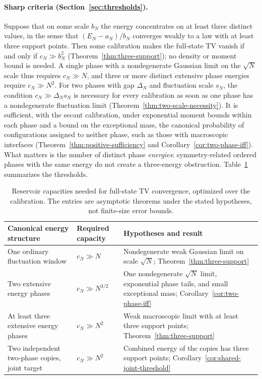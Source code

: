 \paragraph{Sharp criteria (Section~\ref{sec:thresholds}).}
Suppose that on some scale $b_N$ the energy concentrates on at least
three distinct values, in the sense that $(E_N-a_N)/b_N$ converges
weakly to a law with at least three support points. Then some
calibration makes the full-state TV vanish if and only if
$c_N\gg b_N^2$ (Theorem~\ref{thm:three-support}); no density or moment
bound is needed. A single phase with a nondegenerate Gaussian limit on
the $\sqrt N$ scale thus requires $c_N\gg N$, and three or more
distinct extensive phase energies require $c_N\gg N^2$. For two phases
with gap $\Delta_N$ and fluctuation scale $s_N$, the condition
$c_N\gg\Delta_Ns_N$ is necessary for every calibration as soon as one
phase has a nondegenerate fluctuation limit
(Theorem~\ref{thm:two-scale-necessity}). It is sufficient, with the
secant calibration, under exponential moment bounds within each phase
and a bound on the exceptional mass, the canonical probability of
configurations assigned to neither phase, such as those with
macroscopic interfaces (Theorem~\ref{thm:positive-sufficiency} and
Corollary~\ref{cor:two-phase-iff}). What matters is the number of
distinct phase \emph{energies}: symmetry-related ordered phases with the
same energy do not create a three-energy obstruction.
Table~\ref{tab:threshold-summary} summarizes the thresholds.

\begin{table}[t]
\centering
\caption{Reservoir capacities needed for full-state TV convergence,
optimized over the calibration. The entries are asymptotic theorems
under the stated hypotheses, not finite-size error bounds.}
\label{tab:threshold-summary}
\small
\renewcommand{\arraystretch}{1.12}
\begin{tabular}{@{}>{\raggedright\arraybackslash}p{.29\linewidth}>{\raggedright\arraybackslash}p{.21\linewidth}>{\raggedright\arraybackslash}p{.41\linewidth}@{}}
\toprule
Canonical energy structure & Required capacity & Hypotheses and result\\
\midrule
One ordinary fluctuation window & $c_N\gg N$ &
Nondegenerate weak Gaussian limit on scale $\sqrt N$;
Theorem~\ref{thm:three-support}\\[3pt]
Two extensive energy phases & $c_N\gg N^{3/2}$ &
One nondegenerate $\sqrt N$ limit, exponential phase tails, and small
exceptional mass; Corollary~\ref{cor:two-phase-iff}\\[3pt]
At least three extensive energy phases & $c_N\gg N^2$ &
Weak macroscopic limit with at least three support points;
Theorem~\ref{thm:three-support}\\[3pt]
Two independent two-phase copies, joint target & $c_N\gg N^2$ &
Combined energy of the copies has three support points;
Corollary~\ref{cor:shared-joint-threshold}\\
\bottomrule
\end{tabular}
\end{table}

